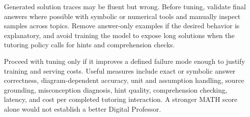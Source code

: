 \documentclass[11pt]{article}
\begin{document}
Generated solution traces may be fluent but wrong. Before tuning, validate final answers where possible with symbolic or numerical tools and manually inspect samples across topics. Remove answer-only examples if the desired behavior is explanatory, and avoid training the model to expose long solutions when the tutoring policy calls for hints and comprehension checks.

Proceed with tuning only if it improves a defined failure mode enough to justify training and serving costs. Useful measures include exact or symbolic answer correctness, diagram-dependent accuracy, unit and assumption handling, source grounding, misconception diagnosis, hint quality, comprehension checking, latency, and cost per completed tutoring interaction. A stronger MATH score alone would not establish a better Digital Professor.
\end{document}

